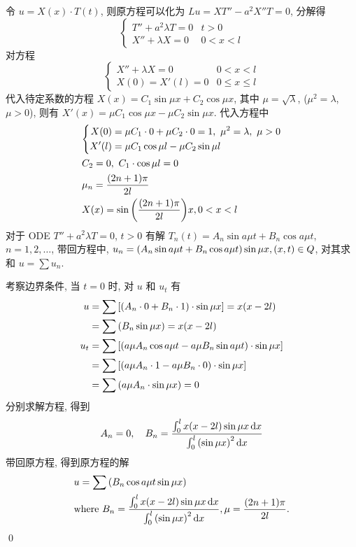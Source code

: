 \begin{solution}
令 $u = X(x) \cdot T(t)$, 则原方程可以化为 $Lu = XT'' - a^2 X''T = 0$, 分解得
\[ \begin{cases}
T'' + a^2 \lambda T = 0 & t > 0 \\
X'' + \lambda X = 0 & 0 < x < l
\end{cases} \]
对方程
\[ \begin{cases}
X'' + \lambda X = 0 & 0 < x < l \\
X(0) = X'(l) = 0 & 0 \leq x \leq l
\end{cases} \]
代入待定系数的方程 $X(x) = C_1 \sin \mu x + C_2 \cos \mu x$, 其中
$\mu = \sqrt\lambda$, ($\mu^2 = \lambda$, $\mu > 0$), 则有
$X'(x) = \mu C_1 \cos \mu x - \mu C_2 \sin \mu x$. 代入方程中
\begin{align*}
& \mequlist{
    X(0) &= \mu C_1\cdot 0 + \mu C_2\cdot 0 = 1,\ \mu^2 = \lambda,\ \mu > 0 \\
    X'(l) &= \mu C_1 \cos \mu l - \mu C_2 \sin \mu l
} \\
& C_2 = 0,\ C_1 \cdot \cos \mu l = 0 \\
& \mu_n = \frac{(2n+1)\pi}{2l} \\
& X(x) = \sin \mclosure{\frac{(2n+1)\pi}{2l}} x, 0 < x < l
\end{align*}
对于 ODE $T'' + a^2\lambda T = 0$, $t > 0$ 有解
$T_n(t) = A_n \sin a \mu t + B_n \cos a \mu t$, $n = 1, 2, \ldots$, 带回方程中,
$u_n = {\left( {A_n \sin a \mu t + B_n \cos a \mu t} \right)} \sin \mu x, (x, t) \in Q$,
对其求和 $u = \sum u_n$.

考察边界条件, 当 $t = 0$ 时, 对 $u$ 和 $u_t$ 有
\begin{align*}
u &= \sum {\left[ {
    {\left( {A_n \cdot 0 + B_n \cdot 1} \right)} \cdot \sin \mu x
} \right]} = x(x - 2l) \\
&= \sum {\left( {B_n \sin \mu x} \right)} = x(x - 2l) \\
u_t &= \sum {\left[ {
    {\left( {a \mu A_n \cos a \mu t - a \mu B_n \sin a \mu t} \right)} \cdot \sin \mu x
} \right]} \\
&= \sum {\left[ {
    {\left( {a \mu A_n \cdot 1 - a \mu B_n \cdot 0} \right)} \cdot \sin \mu x
} \right]} \\
&= \sum {\left( {a \mu A_n \cdot \sin \mu x} \right)} = 0
\end{align*}
分别求解方程, 得到
\[ A_n = 0, \quad B_n = \frac{
    \int_0^l x(x-2l)\sin \mu x \operatorname{d\!} x
}{
    \int_0^l {\left( {\sin \mu x} \right)}^2 \operatorname{d\!} x 
} \]
带回原方程, 得到原方程的解
\begin{align*}
&u = \sum {\left( {B_n \cos a \mu t \sin \mu x} \right)} \\
&\text{where } B_n = \frac{
    \int_0^l x(x-2l)\sin \mu x \operatorname{d\!} x
}{
    \int_0^l {\left( {\sin \mu x} \right)}^2 \operatorname{d\!} x 
}, \mu = \frac{(2n+1)\pi}{2l}.
\end{align*}
\qed
\end{solution}
